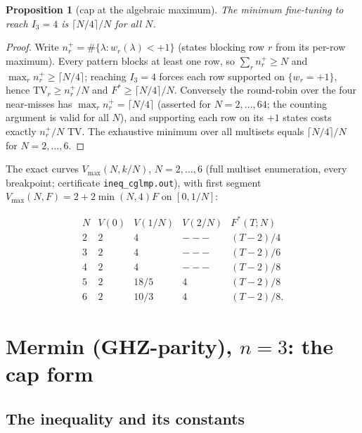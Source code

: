 \documentclass[aps,pra,reprint,superscriptaddress,floatfix]{revtex4-2}
\newcommand{\TV}{\mathrm{TV}}
\newtheorem{proposition}{Proposition}
\begin{document}
\begin{proposition}[cap at the algebraic maximum]
\label{prop:cglmpcap}
The minimum fine-tuning to reach $I_{3}=4$ is $\lceil N/4\rceil/N$ for all
$N$.
\end{proposition}

\begin{proof}
Write $n_{r}^{+}=\#\{\lambda: w_{r}(\lambda)<+1\}$ (states blocking row
$r$ from its per-row maximum). Every pattern blocks at least one row, so
$\sum_{r}n_{r}^{+}\ge N$ and $\max_{r}n_{r}^{+}\ge \lceil N/4\rceil$;
reaching $I_{3}=4$ forces each row supported on $\{w_{r}=+1\}$, hence
$\TV_{r}\ge n_{r}^{+}/N$ and $F^{*}\ge \lceil N/4\rceil/N$. Conversely the
round-robin over the four near-misses has $\max_{r}n_{r}^{+}=\lceil
N/4\rceil$ (asserted for $N=2,\dots,64$; the counting argument is valid
for all $N$), and supporting each row on its $+1$ states costs exactly
$n_{r}^{+}/N$ TV. The exhaustive minimum over all multisets equals
$\lceil N/4\rceil/N$ for $N=2,\dots,6$.
\end{proof}

The exact curves $V_{\max}(N,k/N)$, $N=2,\dots,6$ (full multiset
enumeration, every breakpoint; certificate \texttt{ineq\_cglmp.out}), with
first segment $V_{\max}(N,F)=2+2\min(N,4)F$ on $[0,1/N]$:

\begin{equation*}
\begin{array}{c|cccc}
N & V(0) & V(1/N) & V(2/N) & F^{*}(T;N)\\
\hline
2 & 2 & 4 & --- & (T-2)/4\\
3 & 2 & 4 & --- & (T-2)/6\\
4 & 2 & 4 & --- & (T-2)/8\\
5 & 2 & 18/5 & 4 & (T-2)/8\\
6 & 2 & 10/3 & 4 & (T-2)/8.
\end{array}
\end{equation*}

\section{{Mermin} (GHZ-parity), $n=3$: the cap form}
\label{sec:mermin3}

\subsection{The inequality and its constants}
\end{document}

